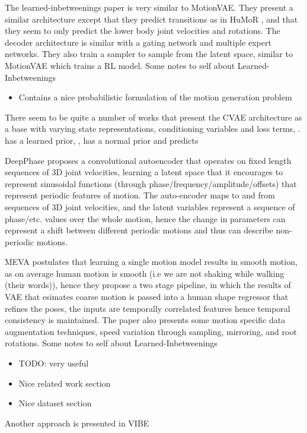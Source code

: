The learned-inbetweenings \cite{learnedInbetweening} paper is very similar to MotionVAE. They present a similar architecture except that they predict transitions as in HuMoR \cite{humor}, and that they seem to only predict the lower body joint velocities and rotations. The decoder architecture is similar with a gating network and multiple expert networks. They also train a sampler to sample from the latent space, similar to MotionVAE which trains a RL model.
Some notes to self about Learned-Inbetweenings
\begin{itemize}
    \item Contains a nice probabilistic formulation of the motion generation problem
\end{itemize}


There seem to be quite a number of works that present the CVAE architecture as a base with varying state representations, conditioning variables and loss terms, \cite{humor, learnedInbetweening, MotionVAE,structured4Dlatentspace}. \cite{humor} has a learned prior, , \cite{learnedInbetweening} has a normal prior and predicts


DeepPhase \cite{DeepPhase} proposes a convolutional autoencoder that operates on fixed length  sequences of 3D joint velocities, learning a latent space that it encourages to represent sinusoidal functions (through phase/frequency/amplitude/offsets) that represent periodic features of motion. The auto-encoder maps to and from sequences of 3D joint velocities, and the latent variables represent a sequence of phase/etc. values over the whole motion, hence the change in parameters can represent a shift between different periodic motions and thus can describe non-periodic motions.


MEVA \cite{MEVA} postulates that learning a single motion model results in smooth motion, as on average human motion is smooth (i.e we are not shaking while walking (their words)), hence they propose a two stage pipeline, in which the results of VAE that esimates coarse motion is passed into a human shape regressor that refines the poses, the inputs are temporally correlated features hence temporal consistency is maintained. The paper also presents some motion specific data augmentation techniques, speed variation through sampling, mirroring, and root rotations. 
Some notes to self about Learned-Inbetweenings
\begin{itemize}
    \item TODO: very useful
    \item Nice related work section
    \item Nice dataset section
\end{itemize}


Another approach is presented in VIBE 